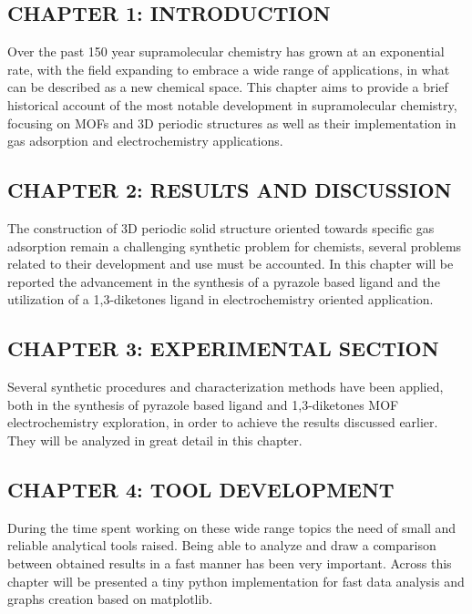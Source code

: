\documentclass[a4,11pt,openright]{report}
\begin{document}
\subsection*{CHAPTER 1: INTRODUCTION}
Over the past 150 year supramolecular chemistry has grown at an exponential rate, with the field expanding to embrace a wide range of applications, in what can be described as a new chemical space. This chapter aims to provide a brief historical account of the most notable development in supramolecular chemistry, focusing on MOFs and 3D periodic structures as well as their implementation in gas adsorption and electrochemistry applications.
\newline\subsection*{CHAPTER 2: RESULTS AND DISCUSSION}
The construction of 3D periodic solid structure oriented towards specific gas adsorption remain a challenging synthetic problem for chemists, several problems related to their development and use must be accounted. In this chapter will be reported the advancement in the synthesis of a pyrazole based ligand and the utilization of a 1,3-diketones ligand in electrochemistry oriented application.
\newline\subsection*{CHAPTER 3: EXPERIMENTAL SECTION}
Several synthetic procedures and characterization methods have been applied, both in the synthesis of pyrazole based ligand and 1,3-diketones MOF electrochemistry exploration, in order to achieve the results discussed earlier. They will be analyzed in great detail in this chapter.
\newline\subsection*{CHAPTER 4: TOOL DEVELOPMENT}
During the time spent working on these wide range topics the need of small and reliable analytical tools raised. Being able to analyze and draw a comparison between obtained results in a fast manner has been very important. Across this chapter will be presented a tiny python implementation for fast data analysis and graphs creation based on matplotlib.


\afterpage{\blankpage}
\newpage










\printbibliography[heading=bibintoc]


\end{document}
